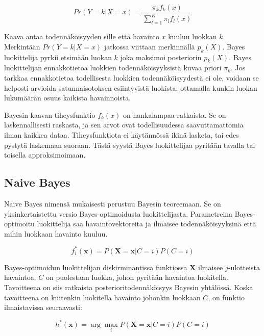 \documentclass[finnish,twoside,openright]{HYgraduMLDS}
\begin{document}
\begin{equation} \label{eq:bayes}
    Pr(Y = k | X = x) = \frac{\pi_k f_k(x)}{\sum^K_{l=1} \pi_l f_l(x)}
\end{equation}

Kaava antaa todennäköisyyden sille että havainto $x$ kuuluu luokkan $k$. Merkintään $Pr(Y = k | X = x)$ jatkossa viittaan merkinnällä $p_k(X)$. %
Bayes luokittelija pyrkii etsimään luokan $k$ joka maksimoi posteriorin $p_k(X)$. Bayes luokittelijan ennakkotietoa luokkien todennäköisyyksistä kuvaa priori $\pi_k$. Jos tarkkaa ennakkotietoa todellisesta luokkien todennäköisyydestä ei ole, voidaan se helposti arvioida satunnaisotoksen esiintyvistä luokista: ottamalla kunkin luokan lukumäärän osuus kaikista havainnoista. 

Bayesin kaavan tiheysfunktio $f_k(x)$ on hankalampaa ratkaista. Se on laskennallisesti raskasta, ja sen arvot ovat todellisuudessa saavuttamattomia ilman kaikkea dataa. Tiheysfunktiota ei käytännössä ikinä lasketa, tai edes pystytä laskemaan suoraan. Tästä syystä Bayes luokittelijaa pyritään tavalla tai toisella approksimoimaan\cite{james2013ISLR}.


\subsection{Naive Bayes}

Naive Bayes nimensä mukaisesti perustuu Bayesin teoreemaan. Se on yksinkertaistettu versio Bayes-optimoidusta luokittelijasta. Parametreina Bayes-optimoitu luokittelija saa havaintovektoreita ja ilmaisee todennäköisyyksinä että mihin luokkaan havainto kuuluu\cite{rish2001empirical}.

\begin{equation}
    f^*_i(\textbf{x}) = P(\textbf{X}=\textbf{x} | C=i) P(C=i)
\end{equation}

Bayes-optimoidun luokittelijan diskirminantissa funktiossa $\textbf{X}$ ilmaisee $j$-ulotteista havaintoa. $C$ on puolestaan luokka, johon pyritään havaintoa luokitella. Tavoitteena on siis ratkaista posterioritodennäköisyys Bayesin yhtälössä. Koska tavoitteena on kuitenkin luokitella havainto johonkin luokkaan $C$, on funktio ilmaistavissa seuraavasti\cite{rish2001empirical}:

\begin{equation}
    h^*(\textbf{x}) = \arg \max_i P(\textbf{X} = \textbf{x}|C=i) P(C = i)
\end{equation}
\end{document}
